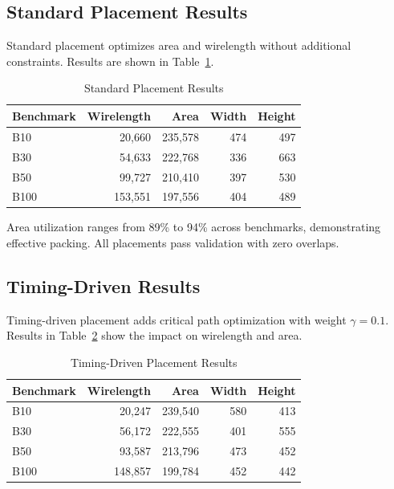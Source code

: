 \documentclass[11pt]{article}
\begin{document}
\subsection{Standard Placement Results}

Standard placement optimizes area and wirelength without additional constraints. Results are shown in Table~\ref{tab:standard}.

\begin{table}[H]
\centering
\caption{Standard Placement Results}
\label{tab:standard}
\begin{tabular}{|l|r|r|r|r|}
\hline
\textbf{Benchmark} & \textbf{Wirelength} & \textbf{Area} & \textbf{Width} & \textbf{Height} \\
\hline
B10  & 20,660  & 235,578 & 474 & 497 \\
B30  & 54,633  & 222,768 & 336 & 663 \\
B50  & 99,727  & 210,410 & 397 & 530 \\
B100 & 153,551 & 197,556 & 404 & 489 \\
\hline
\end{tabular}
\end{table}

Area utilization ranges from 89\% to 94\% across benchmarks, demonstrating effective packing. All placements pass validation with zero overlaps.

\subsection{Timing-Driven Results}

Timing-driven placement adds critical path optimization with weight $\gamma = 0.1$. Results in Table~\ref{tab:timing} show the impact on wirelength and area.

\begin{table}[H]
\centering
\caption{Timing-Driven Placement Results}
\label{tab:timing}
\begin{tabular}{|l|r|r|r|r|}
\hline
\textbf{Benchmark} & \textbf{Wirelength} & \textbf{Area} & \textbf{Width} & \textbf{Height} \\
\hline
B10  & 20,247  & 239,540 & 580 & 413 \\
B30  & 56,172  & 222,555 & 401 & 555 \\
B50  & 93,587  & 213,796 & 473 & 452 \\
B100 & 148,857 & 199,784 & 452 & 442 \\
\hline
\end{tabular}
\end{table}
\end{document}

